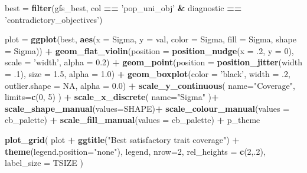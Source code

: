 \documentclass[]{book}
\newenvironment{Shaded}{\begin{snugshade}}{\end{snugshade}}
\newcommand{\DataTypeTok}[1]{\textcolor[rgb]{0.13,0.29,0.53}{#1}}
\newcommand{\DecValTok}[1]{\textcolor[rgb]{0.00,0.00,0.81}{#1}}
\newcommand{\FloatTok}[1]{\textcolor[rgb]{0.00,0.00,0.81}{#1}}
\newcommand{\KeywordTok}[1]{\textcolor[rgb]{0.13,0.29,0.53}{\textbf{#1}}}
\newcommand{\NormalTok}[1]{#1}
\newcommand{\OperatorTok}[1]{\textcolor[rgb]{0.81,0.36,0.00}{\textbf{#1}}}
\newcommand{\OtherTok}[1]{\textcolor[rgb]{0.56,0.35,0.01}{#1}}
\newcommand{\StringTok}[1]{\textcolor[rgb]{0.31,0.60,0.02}{#1}}
\begin{document}
\begin{Shaded}
\begin{Highlighting}[]
\NormalTok{best =}\StringTok{ }\KeywordTok{filter}\NormalTok{(gfs_best, col }\OperatorTok{==}\StringTok{ 'pop_uni_obj'} \OperatorTok{&}\StringTok{ }\NormalTok{diagnostic }\OperatorTok{==}\StringTok{ 'contradictory_objectives'}\NormalTok{)}

\NormalTok{plot =}\StringTok{ }\KeywordTok{ggplot}\NormalTok{(best, }\KeywordTok{aes}\NormalTok{(}\DataTypeTok{x =}\NormalTok{ Sigma, }\DataTypeTok{y =}\NormalTok{ val, }\DataTypeTok{color =}\NormalTok{ Sigma, }\DataTypeTok{fill =}\NormalTok{ Sigma, }\DataTypeTok{shape =}\NormalTok{ Sigma)) }\OperatorTok{+}
\StringTok{  }\KeywordTok{geom_flat_violin}\NormalTok{(}\DataTypeTok{position =} \KeywordTok{position_nudge}\NormalTok{(}\DataTypeTok{x =} \FloatTok{.2}\NormalTok{, }\DataTypeTok{y =} \DecValTok{0}\NormalTok{), }\DataTypeTok{scale =} \StringTok{'width'}\NormalTok{, }\DataTypeTok{alpha =} \FloatTok{0.2}\NormalTok{) }\OperatorTok{+}
\StringTok{  }\KeywordTok{geom_point}\NormalTok{(}\DataTypeTok{position =} \KeywordTok{position_jitter}\NormalTok{(}\DataTypeTok{width =} \FloatTok{.1}\NormalTok{), }\DataTypeTok{size =} \FloatTok{1.5}\NormalTok{, }\DataTypeTok{alpha =} \FloatTok{1.0}\NormalTok{) }\OperatorTok{+}
\StringTok{  }\KeywordTok{geom_boxplot}\NormalTok{(}\DataTypeTok{color =} \StringTok{'black'}\NormalTok{, }\DataTypeTok{width =} \FloatTok{.2}\NormalTok{, }\DataTypeTok{outlier.shape =} \OtherTok{NA}\NormalTok{, }\DataTypeTok{alpha =} \FloatTok{0.0}\NormalTok{) }\OperatorTok{+}
\StringTok{  }\KeywordTok{scale_y_continuous}\NormalTok{(}
    \DataTypeTok{name=}\StringTok{"Coverage"}\NormalTok{,}
    \DataTypeTok{limits=}\KeywordTok{c}\NormalTok{(}\DecValTok{0}\NormalTok{, }\DecValTok{5}\NormalTok{)}
\NormalTok{  ) }\OperatorTok{+}
\StringTok{  }\KeywordTok{scale_x_discrete}\NormalTok{(}
    \DataTypeTok{name=}\StringTok{"Sigma"}
\NormalTok{  )}\OperatorTok{+}
\StringTok{  }\KeywordTok{scale_shape_manual}\NormalTok{(}\DataTypeTok{values=}\NormalTok{SHAPE)}\OperatorTok{+}
\StringTok{  }\KeywordTok{scale_colour_manual}\NormalTok{(}\DataTypeTok{values =}\NormalTok{ cb_palette) }\OperatorTok{+}
\StringTok{  }\KeywordTok{scale_fill_manual}\NormalTok{(}\DataTypeTok{values =}\NormalTok{ cb_palette) }\OperatorTok{+}
\StringTok{  }\NormalTok{p_theme}

\KeywordTok{plot_grid}\NormalTok{(}
\NormalTok{  plot }\OperatorTok{+}
\StringTok{    }\KeywordTok{ggtitle}\NormalTok{(}\StringTok{"Best satisfactory trait coverage"}\NormalTok{) }\OperatorTok{+}
\StringTok{    }\KeywordTok{theme}\NormalTok{(}\DataTypeTok{legend.position=}\StringTok{"none"}\NormalTok{),}
\NormalTok{  legend,}
  \DataTypeTok{nrow=}\DecValTok{2}\NormalTok{,}
  \DataTypeTok{rel_heights =} \KeywordTok{c}\NormalTok{(}\DecValTok{2}\NormalTok{,.}\DecValTok{2}\NormalTok{),}
  \DataTypeTok{label_size =}\NormalTok{ TSIZE}
\NormalTok{)}
\end{Highlighting}
\end{Shaded}
\end{document}
